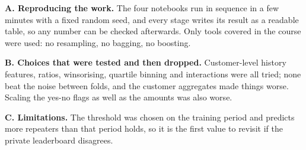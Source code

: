\documentclass[11pt,a4paper]{article}
\newcommand{\anx}[1]{\textbf{#1.}\space}
\begin{document}
\anx{A. Reproducing the work} The four notebooks run in sequence in a few minutes with a fixed random seed, and
every stage writes its result as a readable table, so any number can be checked afterwards. Only tools covered in
the course were used: no resampling, no bagging, no boosting.

\anx{B. Choices that were tested and then dropped} Customer-level history features, ratios, winsorising, quartile
binning and interactions were all tried; none beat the noise between folds, and the customer aggregates made
things worse. Scaling the yes-no flags as well as the amounts was also worse.

\anx{C. Limitations} The threshold was chosen on the training period and predicts more repeaters than that period
holds, so it is the first value to revisit if the private leaderboard disagrees.
\end{document}
